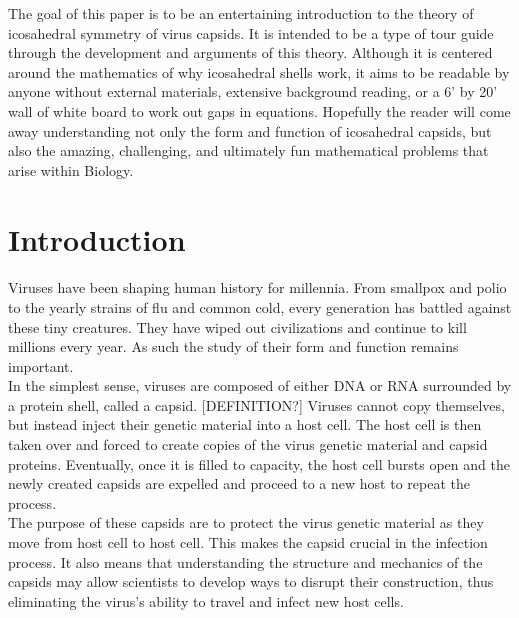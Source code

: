 \documentclass[12pt,letter]{article}
\begin{document}
The goal of this paper is to be an entertaining introduction to the theory of icosahedral symmetry of virus capsids. It is intended to be a type of tour guide through the development and arguments of this theory. Although it is centered around the mathematics of why icosahedral shells work, it aims to be readable by anyone without external materials, extensive background reading, or a 6' by 20' wall of white board to work out gaps in equations. Hopefully the reader will come away understanding not only the form and function of icosahedral capsids, but also the amazing, challenging, and ultimately fun mathematical problems that arise within Biology. 

\section{Introduction} %

\paragraph{}
Viruses have been shaping human history for millennia. From smallpox and polio to the yearly strains of flu and common cold, every generation has battled against these tiny creatures. They have wiped out civilizations and continue to kill millions every year. As such the study of their form and function remains important. \\

In the simplest sense, viruses are composed of either DNA or RNA surrounded by a protein shell, called a capsid. [DEFINITION?] Viruses cannot copy themselves, but instead inject their genetic material into a host cell. The host cell is then taken over and forced to create copies of the virus genetic material and capsid proteins. Eventually, once it is filled to capacity, the host cell bursts open and the newly created capsids are expelled and proceed to a new host to repeat the process. \\

The purpose of these capsids are to protect the virus genetic material as they move from host cell to host cell. This makes the capsid crucial in the infection process. It also means that understanding the structure and mechanics of the capsids may allow scientists to develop ways to disrupt their construction, thus eliminating the virus's ability to travel and infect new host cells. \\
\end{document}
